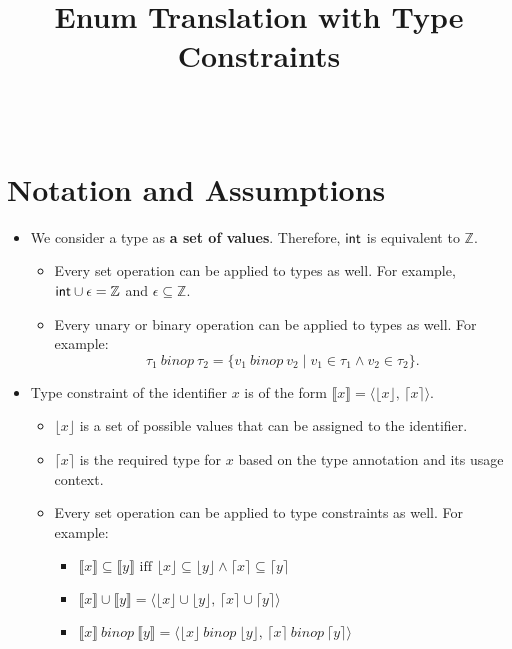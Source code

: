 \documentclass[peerreview, 10pt]{IEEEtran}
\newcommand{\Z}{\ensuremath{\mathbb{Z}}}
\newcommand{\cons}[1]{\ensuremath{\llbracket#1\rrbracket}}
\newcommand{\consp}[2]{\ensuremath{\langle#1,\,#2\rangle}}
\newcommand{\floor}[1]{\ensuremath{\lfloor#1\rfloor}}
\newcommand{\ceil}[1]{\ensuremath{\lceil#1\rceil}}
\newcommand{\enum}{\ensuremath{\epsilon}}
\begin{document}
\title{Enum Translation with Type Constraints}

\author{
    \\
}

\maketitle

\section{Notation and Assumptions}

\begin{itemize}
  \item We consider a type as {\bf a set of values}. Therefore, ${\sf int}$ is equivalent to $\Z$.
  \begin{itemize}
     \item Every set operation can be applied to types as well. For example, ${\sf int} \cup \enum = \Z$ and $\enum\subseteq\Z$.
     \item Every unary or binary operation can be applied to types as well. For example: $$\tau_1\ {binop}\ \tau_2 = \{v_1\ {binop}\ v_2 \mid v_1 \in \tau_1 \land v_2 \in \tau_2\}.$$
  \end{itemize}
  \item Type constraint of the identifier $x$ is of the form $\cons{x} = \consp{\floor{x}}{\ceil{x}}$.
  \begin{itemize}
    \item $\floor{x}$ is a set of possible values that can be assigned to the identifier.
    \item $\ceil{x}$ is the required type for $x$ based on the type annotation and its usage context.
    \item Every set operation can be applied to type constraints as well. For example:
    \begin{itemize}
      \item $\cons{x}\subseteq\cons{y} \text{ iff } \floor{x} \subseteq \floor{y} \land \ceil{x} \subseteq \ceil{y}$
      \item $\cons{x} \cup \cons{y} = \consp{\floor{x} \cup \floor{y}}{\ceil{x} \cup \ceil{y}}$
      \item $\cons{x}\ binop\ \cons{y} = \consp{\floor{x}\ binop\ \floor{y}}{\ceil{x}\ binop\ \ceil{y}}$
    \end{itemize}
  \end{itemize}
\end{itemize}
\end{document}

